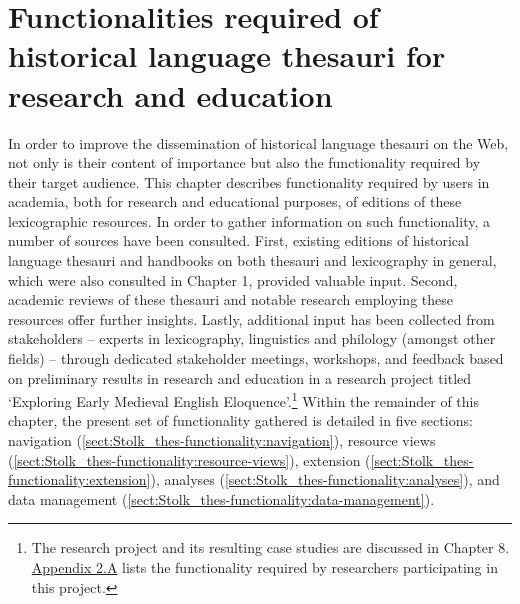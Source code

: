 \chapter{Functionalities required of historical language thesauri for research and education}


In order to improve the dissemination of historical language thesauri on the Web, not only is their content of importance but also the functionality required by their target audience. This chapter describes functionality required by users in academia, both for research and educational purposes, of editions of these lexicographic resources. In order to gather information on such functionality, a number of sources have been consulted. First, existing editions of historical language thesauri and handbooks on both thesauri and lexicography in general, which were also consulted in Chapter 1, provided valuable input. Second, academic reviews of these thesauri and notable research employing these resources offer further insights. Lastly, additional input has been collected from stakeholders -- experts in lexicography, linguistics and philology (amongst other fields) -- through dedicated stakeholder meetings, workshops, and feedback based on preliminary results in research and education in a research project titled `Exploring Early Medieval English Eloquence'.\footnote{The research project and its resulting case studies are discussed in Chapter 8. \hyperref[Appendix2.A]{Appendix 2.A} lists the functionality required by researchers participating in this project.} %
Within the remainder of this chapter, the present set of functionality gathered is detailed in five sections: navigation (\ref{sect:Stolk_thes-functionality:navigation}), resource views (\ref{sect:Stolk_thes-functionality:resource-views}), extension (\ref{sect:Stolk_thes-functionality:extension}), analyses (\ref{sect:Stolk_thes-functionality:analyses}), and data management (\ref{sect:Stolk_thes-functionality:data-management}).



